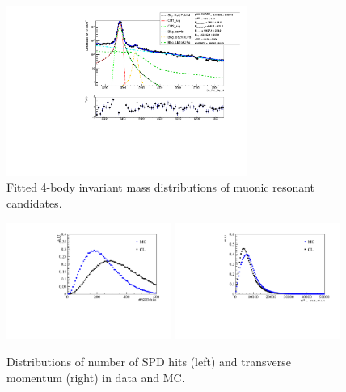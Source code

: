  \begin{figure}[h!]
\centering
\includegraphics[width=0.7\textwidth]{RKst/figs/sW/KstJPsMM_log_fitAndRes.pdf}
\caption{Fitted 4-body invariant mass distributions of muonic resonant candidates.}
\label{fig:RKst_sW_mass}
\end{figure}

 \begin{figure}[h!]
\centering
\includegraphics[width=0.48\textwidth]{RKst/figs/nspd_12.pdf}
\includegraphics[width=0.48\textwidth]{RKst/figs/bpt.pdf}
\caption{Distributions of number of SPD hits (left) and \Bz transverse momentum (right) in data and MC.}
\label{fig:b0pt_nSPD_distrib}
\end{figure}

